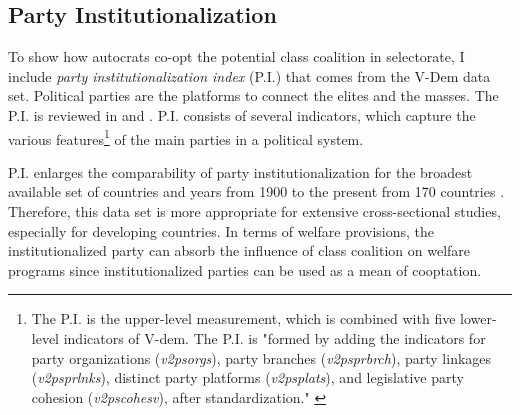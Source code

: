 \documentclass[11pt, notitlepage]{article}
\begin{document}
\subsection{Party Institutionalization}

To show how autocrats co-opt the potential class coalition in selectorate, I include \textit{party institutionalization index} (P.I.) that comes from the V-Dem data set. Political parties are the platforms to connect the elites and the masses. The P.I. is reviewed in \citet{Bizzarro2018} and \citet{Rasmussen2019}. P.I. consists of several indicators, which capture the various features\footnote{The P.I. is the upper-level measurement, which is combined with five lower-level indicators of V-dem. The P.I. is "formed by adding the indicators for party organizations (\textit{v2psorgs}), party branches (\textit{v2psprbrch}), party linkages (\textit{v2psprlnks}), distinct party platforms (\textit{v2psplats}), and legislative party cohesion (\textit{v2pscohesv}), after standardization." \citep[2]{Bizzarro2017}} of the main parties in a political system.\par

P.I. enlarges the comparability of party institutionalization for the broadest available set of countries and years from 1900 to the present from 170 countries \citep[9]{Rasmussen2019}. Therefore, this data set is more appropriate for extensive cross-sectional studies, especially for developing countries. In terms of welfare provisions, the institutionalized party can absorb the influence of class coalition on welfare programs since institutionalized parties can be used as a mean of cooptation.\par

\end{document}
